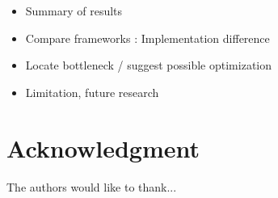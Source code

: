 \documentclass[conference]{IEEEtran}
\begin{document}
\begin{itemize}
  \item Summary of results
  \item Compare frameworks : Implementation difference
  \item Locate bottleneck / suggest possible optimization
  \item Limitation, future research
\end{itemize}

\section*{Acknowledgment}

The authors would like to thank...

\end{document}
